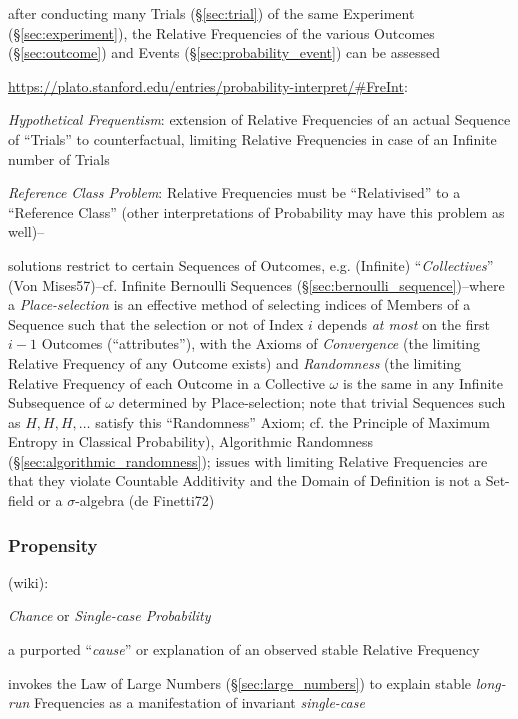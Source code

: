 after conducting many Trials (\S\ref{sec:trial}) of the same Experiment
(\S\ref{sec:experiment}), the Relative Frequencies of the various Outcomes
(\S\ref{sec:outcome}) and Events (\S\ref{sec:probability_event}) can be assessed

\url{https://plato.stanford.edu/entries/probability-interpret/#FreInt}:

\emph{Hypothetical Frequentism}: extension of Relative Frequencies of an actual
Sequence of ``Trials'' to counterfactual, limiting Relative Frequencies in case
of an Infinite number of Trials

\emph{Reference Class Problem}: Relative Frequencies must be ``Relativised'' to
a ``Reference Class'' (other interpretations of Probability may have this
problem as well)--

solutions restrict to certain Sequences of Outcomes, e.g. (Infinite)
``\emph{Collectives}'' (Von Mises57)--cf. Infinite Bernoulli Sequences
(\S\ref{sec:bernoulli_sequence})--where a \emph{Place-selection} is an effective
method of selecting indices of Members of a Sequence such that the selection or
not of Index $i$ depends \emph{at most} on the first $i-1$ Outcomes
(``attributes''), with the Axioms of \emph{Convergence} (the limiting Relative
Frequency of any Outcome exists) and \emph{Randomness} (the limiting Relative
Frequency of each Outcome in a Collective $\omega$ is the same in any Infinite
Subsequence of $\omega$ determined by Place-selection; note that trivial
Sequences such as $H,H,H,\ldots$ satisfy this ``Randomness'' Axiom; cf. the
Principle of Maximum Entropy in Classical Probability), Algorithmic Randomness
(\S\ref{sec:algorithmic_randomness});
issues with limiting Relative Frequencies are that they violate Countable
Additivity and the Domain of Definition is not a Set-field or a $\sigma$-algebra
(de Finetti72)



\subsubsection{Propensity}\label{sec:propensity}

(wiki):

\emph{Chance} or \emph{Single-case Probability}

a purported ``\emph{cause}'' or explanation of an observed stable Relative
Frequency

invokes the Law of Large Numbers (\S\ref{sec:large_numbers}) to explain stable
\emph{long-run} Frequencies as a manifestation of invariant \emph{single-case}



